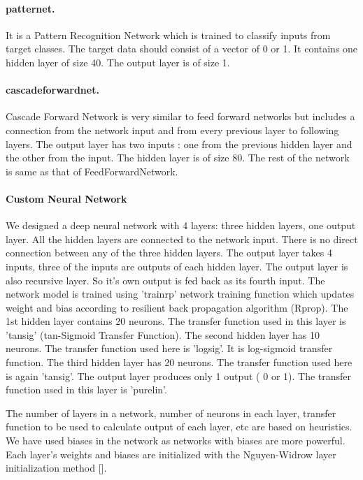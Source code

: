 \paragraph{patternet.} It is a Pattern Recognition Network which is trained to classify inputs from target classes. The target data should consist of a vector of 0 or 1. It contains one hidden layer of size 40. The output layer is of size 1.


\paragraph{cascadeforwardnet.}  Cascade Forward Network is very similar to feed forward networks but includes a connection from the network input and from every previous layer to following layers. The output layer has two inputs : one from the previous hidden layer and the other from the input. The hidden layer is of size 80. The rest of the network is same as that of FeedForwardNetwork.  


\paragraph{Custom Neural Network}  We designed a deep neural network with 4 layers: three hidden layers, one output layer. All the hidden layers are connected to the network input.  There is no direct connection between any of the three hidden layers. The output layer takes 4 inputs, three of the inputs are outputs of each hidden layer. The output layer is also recursive layer. So it's own output is fed back as its fourth input. The network model is trained using 'trainrp' network training function which updates weight and bias according to resilient back propagation algorithm (Rprop).
The 1st hidden layer contains 20 neurons. The transfer function used in this layer is 'tansig' (tan-Sigmoid Transfer Function). The second hidden layer has 10 neurons. The transfer function used here is 'logsig'. It is log-sigmoid transfer function. The third hidden layer has 20 neurons. The transfer function used here is again 'tansig'.  The output layer produces only 1 output ( 0 or 1). The transfer function used in this layer is 'purelin'.


The number of layers in a network, number of neurons in each layer, transfer function to be used to calculate output of each layer, etc are based on heuristics. We have used biases in the network as networks with biases are more powerful. Each layer's weights and biases are initialized with the Nguyen-Widrow layer initialization method [].




